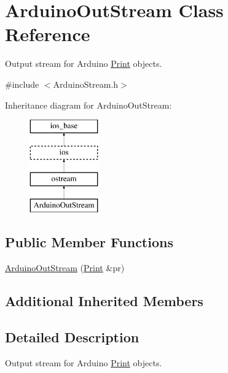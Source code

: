 \hypertarget{class_arduino_out_stream}{\section{Arduino\-Out\-Stream Class Reference}
\label{class_arduino_out_stream}
}


Output stream for Arduino \hyperlink{class_print}{Print} objects.  




{\ttfamily \#include $<$Arduino\-Stream.\-h$>$}

Inheritance diagram for Arduino\-Out\-Stream\-:\begin{figure}[H]
\begin{center}
\leavevmode
\includegraphics[height=4.000000cm]{class_arduino_out_stream}
\end{center}
\end{figure}
\subsection*{Public Member Functions}
\begin{DoxyCompactItemize}
\item 
\hyperlink{class_arduino_out_stream_aae49bad47749fb75a4c0858e1672d099}{Arduino\-Out\-Stream} (\hyperlink{class_print}{Print} \&pr)
\end{DoxyCompactItemize}
\subsection*{Additional Inherited Members}


\subsection{Detailed Description}
Output stream for Arduino \hyperlink{class_print}{Print} objects. 

